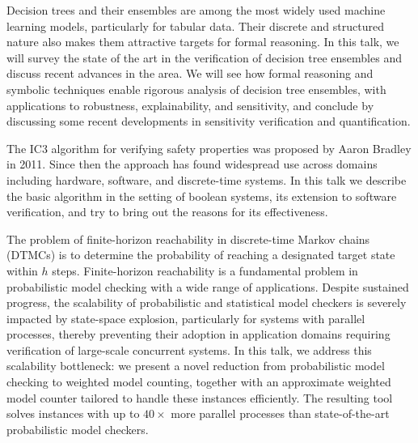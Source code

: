 \documentclass[a4paper,UKenglish]{dagrep-v2021}
\begin{document}
Decision trees and their ensembles are among the most widely used machine learning models, particularly for tabular data. Their discrete and structured nature also makes them attractive targets for formal reasoning. In this talk, we will survey the state of the art in the verification of decision tree ensembles and discuss recent advances in the area. We will see how formal reasoning and symbolic techniques enable rigorous analysis of decision tree ensembles, with applications to robustness, explainability, and sensitivity, and conclude by discussing some recent developments in sensitivity verification and quantification.


The IC3 algorithm for verifying safety properties was proposed by Aaron Bradley in 2011. Since then the approach has found widespread use across domains including hardware, software, and discrete-time systems. In this talk we describe the basic algorithm in the setting of boolean systems, its extension to software verification, and try to bring out the reasons for its effectiveness.


The problem of finite-horizon reachability in discrete-time Markov chains (DTMCs) is to determine the probability of reaching a designated target state within $h$ steps. Finite-horizon reachability is a fundamental problem in probabilistic model checking with a wide range of applications. Despite sustained progress, the scalability of probabilistic and statistical model checkers is severely impacted by state-space explosion, particularly for systems with parallel processes, thereby preventing their adoption in application domains requiring verification of large-scale concurrent systems. In this talk, we address this scalability bottleneck: we present a novel reduction from probabilistic model checking to weighted model counting, together with an approximate weighted model counter tailored to handle these instances efficiently. The resulting tool solves instances with up to $40\times$ more parallel processes than state-of-the-art probabilistic model checkers.

\end{document}
